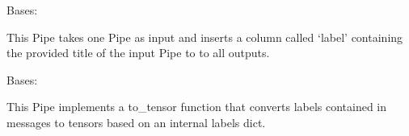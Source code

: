 \documentclass[letterpaper,10pt,english]{sphinxmanual}
\begin{document}

\begin{fulllineitems}
\label{\detokenize{Fireworks:Fireworks.toolbox.pipes.Title2LabelPipe}}
Bases: {\hyperref[\detokenize{Fireworks:Fireworks.core.pipe.HookedPassThroughPipe}]{}}

This Pipe takes one Pipe as input and inserts a column called ‘label’
containing the provided title of the input Pipe to to all outputs.

\begin{fulllineitems}
\label{\detokenize{Fireworks:Fireworks.toolbox.pipes.Title2LabelPipe.insert_labels}}
\end{fulllineitems}


\end{fulllineitems}


\begin{fulllineitems}
\label{\detokenize{Fireworks:Fireworks.toolbox.pipes.LabelerPipe}}
Bases: {\hyperref[\detokenize{Fireworks:Fireworks.core.pipe.Pipe}]{}}

This Pipe implements a to\_tensor function that converts labels contained in messages to tensors based on an internal labels dict.

\begin{fulllineitems}
\label{\detokenize{Fireworks:Fireworks.toolbox.pipes.LabelerPipe.to_tensor}}
\end{fulllineitems}


\end{fulllineitems}
\end{document}

